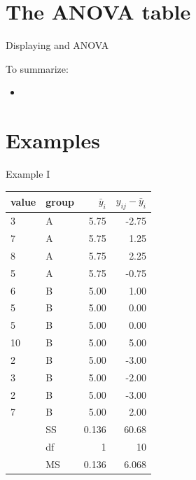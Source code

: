 \section{The ANOVA table}


\begin{frame}{Displaying and ANOVA}

  To summarize:
  \begin{itemize}
    \item 
  \end{itemize}

\end{frame}


\section{Examples}


\begin{frame}{Example I}

\begin{tabular}{ll|rr}
  value & group & $\bar y_i$ & $y_{ij}-\bar y_i$  \\ 
  \hline
3   &  A  &  5.75  &  -2.75      \\
7   &  A  &  5.75  &  1.25       \\
8   &  A  &  5.75  &  2.25       \\
5   &  A  &  5.75  &  -0.75      \\
6   &  B  &  5.00     &  1.00          \\
5   &  B  &  5.00     &  0.00          \\
5   &  B  &  5.00     &  0.00          \\
10  &  B  &  5.00     &  5.00          \\
2   &  B  &  5.00     &  -3.00         \\
3   &  B  &  5.00     &  -2.00         \\
2   &  B  &  5.00     &  -3.00         \\
7   &  B  &  5.00     &  2.00        \\
   \hline
   & SS & 0.136 & 60.68 \\ 
   & df & 1 & 10 \\ 
   & MS & 0.136 & 6.068   \\ 
\end{tabular}

\end{frame}

